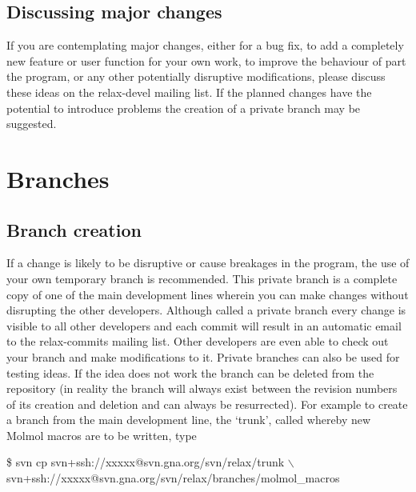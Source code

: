 \subsection{Discussing major changes}

If you are contemplating major changes, either for a bug fix, to add a completely new feature or user function for your own work, to improve the behaviour of part the program, or any other potentially disruptive modifications, please discuss these ideas on the rela\mbox{x-d}evel mailing list.  If the planned changes have the potential to introduce problems the creation of a private branch may be suggested.



\section{Branches}


\subsection{Branch creation}

If a change is likely to be disruptive or cause breakages in the program, the use of your own temporary branch is recommended.  This private branch is a complete copy of one of the main development lines wherein you can make changes without disrupting the other developers.  Although called a private branch every change is visible to all other developers and each commit will result in an automatic email to the relax-commits mailing list.  Other developers are even able to check out your branch and make modifications to it.  Private branches can also be used for testing ideas.  If the idea does not work the branch can be deleted from the repository (in reality the branch will always exist between the revision numbers of its creation and deletion and can always be resurrected).  For example to create a branch from the main development line, the `trunk', called  whereby new Molmol macros are to be written, type

\begin{exampleenv}
\$ svn cp svn+ssh://xxxxx@svn.gna.org/svn/relax/trunk $\backslash$ \\
 svn+ssh://xxxxx@svn.gna.org/svn/relax/branches/molmol\_macros
\end{exampleenv}

